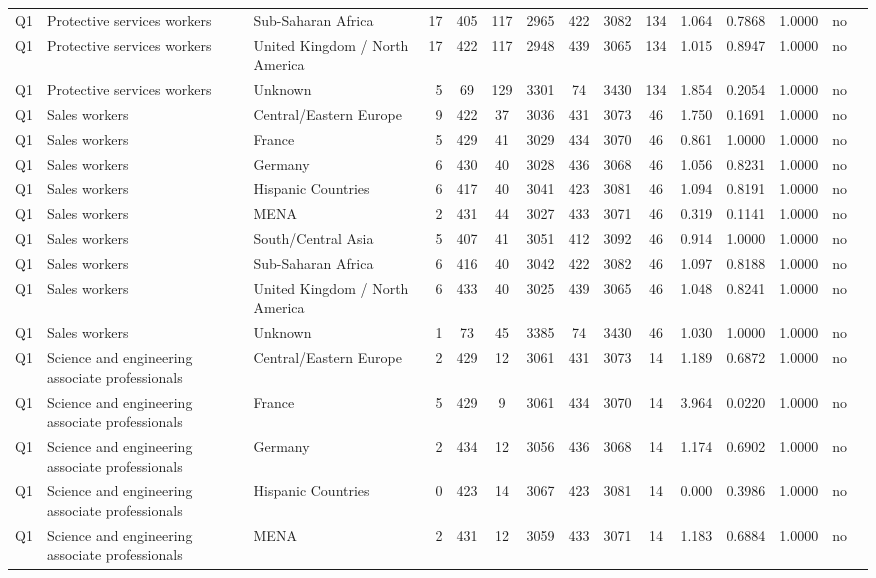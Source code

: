 \begin{longtable}{lllrcccccccccll}
Q1 & Protective services workers & Sub-Saharan Africa & 17 & 405 & 117 & 2965 & 422 & 3082 & 134 & 1.064 & 0.7868 & 1.0000 & no \\
Q1 & Protective services workers & United Kingdom / North America & 17 & 422 & 117 & 2948 & 439 & 3065 & 134 & 1.015 & 0.8947 & 1.0000 & no \\
Q1 & Protective services workers & Unknown & 5 & 69 & 129 & 3301 & 74 & 3430 & 134 & 1.854 & 0.2054 & 1.0000 & no \\
Q1 & Sales workers & Central/Eastern Europe & 9 & 422 & 37 & 3036 & 431 & 3073 & 46 & 1.750 & 0.1691 & 1.0000 & no \\
Q1 & Sales workers & France & 5 & 429 & 41 & 3029 & 434 & 3070 & 46 & 0.861 & 1.0000 & 1.0000 & no \\
Q1 & Sales workers & Germany & 6 & 430 & 40 & 3028 & 436 & 3068 & 46 & 1.056 & 0.8231 & 1.0000 & no \\
Q1 & Sales workers & Hispanic Countries & 6 & 417 & 40 & 3041 & 423 & 3081 & 46 & 1.094 & 0.8191 & 1.0000 & no \\
Q1 & Sales workers & MENA & 2 & 431 & 44 & 3027 & 433 & 3071 & 46 & 0.319 & 0.1141 & 1.0000 & no \\
Q1 & Sales workers & South/Central Asia & 5 & 407 & 41 & 3051 & 412 & 3092 & 46 & 0.914 & 1.0000 & 1.0000 & no \\
Q1 & Sales workers & Sub-Saharan Africa & 6 & 416 & 40 & 3042 & 422 & 3082 & 46 & 1.097 & 0.8188 & 1.0000 & no \\
Q1 & Sales workers & United Kingdom / North America & 6 & 433 & 40 & 3025 & 439 & 3065 & 46 & 1.048 & 0.8241 & 1.0000 & no \\
Q1 & Sales workers & Unknown & 1 & 73 & 45 & 3385 & 74 & 3430 & 46 & 1.030 & 1.0000 & 1.0000 & no \\
Q1 & Science and engineering associate professionals & Central/Eastern Europe & 2 & 429 & 12 & 3061 & 431 & 3073 & 14 & 1.189 & 0.6872 & 1.0000 & no \\
Q1 & Science and engineering associate professionals & France & 5 & 429 & 9 & 3061 & 434 & 3070 & 14 & 3.964 & 0.0220 & 1.0000 & no \\
Q1 & Science and engineering associate professionals & Germany & 2 & 434 & 12 & 3056 & 436 & 3068 & 14 & 1.174 & 0.6902 & 1.0000 & no \\
Q1 & Science and engineering associate professionals & Hispanic Countries & 0 & 423 & 14 & 3067 & 423 & 3081 & 14 & 0.000 & 0.3986 & 1.0000 & no \\
Q1 & Science and engineering associate professionals & MENA & 2 & 431 & 12 & 3059 & 433 & 3071 & 14 & 1.183 & 0.6884 & 1.0000 & no \\

\end{longtable}
